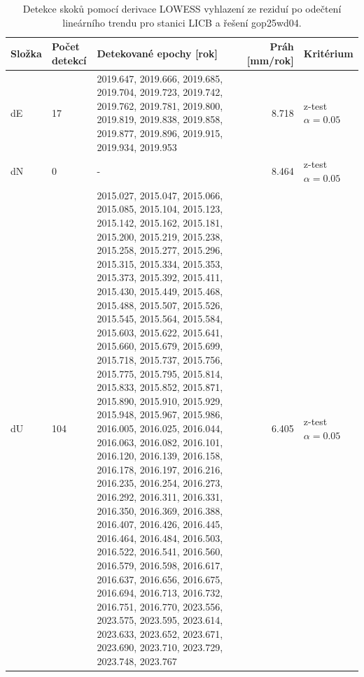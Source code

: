 \begin{table}[htbp]
\caption{Detekce skoků pomocí derivace LOWESS vyhlazení ze reziduí po odečtení lineárního trendu pro stanici LICB a řešení gop25wd04.}
\label{tab:gop25wd04_stcd_licb_detr_weighted_1seg_jumps_lowess_derivative}
\begin{tabular}{lllrl}
\toprule
Složka & Počet detekcí & Detekované epochy [rok] & Práh [mm/rok] & Kritérium \\
\midrule
dE & 17 & 2019.647, 2019.666, 2019.685, 2019.704, 2019.723, 2019.742, 2019.762, 2019.781, 2019.800, 2019.819, 2019.838, 2019.858, 2019.877, 2019.896, 2019.915, 2019.934, 2019.953 & 8.718 & z-test $\alpha=0.05$ \\
dN & 0 & - & 8.464 & z-test $\alpha=0.05$ \\
dU & 104 & 2015.027, 2015.047, 2015.066, 2015.085, 2015.104, 2015.123, 2015.142, 2015.162, 2015.181, 2015.200, 2015.219, 2015.238, 2015.258, 2015.277, 2015.296, 2015.315, 2015.334, 2015.353, 2015.373, 2015.392, 2015.411, 2015.430, 2015.449, 2015.468, 2015.488, 2015.507, 2015.526, 2015.545, 2015.564, 2015.584, 2015.603, 2015.622, 2015.641, 2015.660, 2015.679, 2015.699, 2015.718, 2015.737, 2015.756, 2015.775, 2015.795, 2015.814, 2015.833, 2015.852, 2015.871, 2015.890, 2015.910, 2015.929, 2015.948, 2015.967, 2015.986, 2016.005, 2016.025, 2016.044, 2016.063, 2016.082, 2016.101, 2016.120, 2016.139, 2016.158, 2016.178, 2016.197, 2016.216, 2016.235, 2016.254, 2016.273, 2016.292, 2016.311, 2016.331, 2016.350, 2016.369, 2016.388, 2016.407, 2016.426, 2016.445, 2016.464, 2016.484, 2016.503, 2016.522, 2016.541, 2016.560, 2016.579, 2016.598, 2016.617, 2016.637, 2016.656, 2016.675, 2016.694, 2016.713, 2016.732, 2016.751, 2016.770, 2023.556, 2023.575, 2023.595, 2023.614, 2023.633, 2023.652, 2023.671, 2023.690, 2023.710, 2023.729, 2023.748, 2023.767 & 6.405 & z-test $\alpha=0.05$ \\
\bottomrule
\end{tabular}
\end{table}
